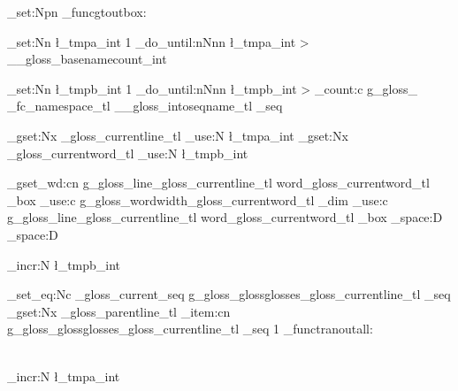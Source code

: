 	\cs_set:Npn \gl_funcgtoutbox:  { 




	\int_set:Nn
			\l_tmpa_int
			{ 1 }
 	\int_do_until:nNnn %
 		{ \l_tmpa_int } > { \g__gloss_basenamecount_int } 
 					{
	
	
 	 				\int_set:Nn
					\l_tmpb_int
					{ 1 }
 					\int_do_until:nNnn %
 					{ \l_tmpb_int } > { \seq_count:c
				{ g_gloss_ \g_fc_namespace_tl \g__gloss_intoseqname_tl _seq } } 	%
 				{
\tl_gset:Nx \g_gloss_currentline_tl { \int_use:N \l_tmpa_int }
\tl_gset:Nx \g_gloss_currentword_tl { \int_use:N \l_tmpb_int }



\box_gset_wd:cn
			{ g_gloss_line\g_gloss_currentline_tl word\g_gloss_currentword_tl _box }
			{ 
					\dim_use:c
							{ g_gloss_wordwidth\g_gloss_currentword_tl _dim }
			}
	\box_use:c %
			{ g_gloss_line\g_gloss_currentline_tl word\g_gloss_currentword_tl _box }
	\tex_space:D %
	\tex_space:D %

			
				\int_incr:N 
						\l_tmpb_int

					} 	
					
	\seq_set_eq:Nc
	  \g_gloss_current_seq 
	  { g_gloss_glossglosses\g_gloss_currentline_tl _seq }
	 \tl_gset:Nx
	     \g_gloss_parentline_tl 
	     {
	        \seq_item:cn
	        { g_gloss_glossglosses\g_gloss_currentline_tl _seq }
	        { 1 }
	     }
		\gl_functranoutall:


			\\ %
						\int_incr:N 
								\l_tmpa_int
		} 	

}



